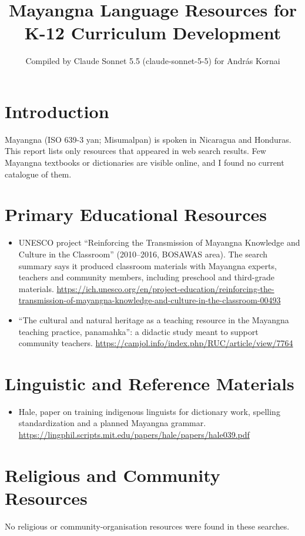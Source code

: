 \documentclass[12pt]{article}
\title{Mayangna Language Resources for K-12 Curriculum Development}
\author{Compiled by Claude Sonnet 5.5 (claude-sonnet-5-5) for Andr\'as Kornai}
\date{}
\begin{document}
\maketitle

\section{Introduction}
Mayangna (ISO 639-3 yan; Misumalpan) is spoken in Nicaragua and Honduras. This report lists only resources that appeared in web search results. Few Mayangna textbooks or dictionaries are visible online, and I found no current catalogue of them.

\section{Primary Educational Resources}
\begin{itemize}
\item UNESCO project ``Reinforcing the Transmission of Mayangna Knowledge and Culture in the Classroom'' (2010--2016, BOSAWAS area). The search summary says it produced classroom materials with Mayangna experts, teachers and community members, including preschool and third-grade materials. \url{https://ich.unesco.org/en/project-education/reinforcing-the-transmission-of-mayangna-knowledge-and-culture-in-the-classroom-00493}
\item ``The cultural and natural heritage as a teaching resource in the Mayangna teaching practice, panamahka'': a didactic study meant to support community teachers. \url{https://camjol.info/index.php/RUC/article/view/7764}
\end{itemize}

\section{Linguistic and Reference Materials}
\begin{itemize}
\item Hale, paper on training indigenous linguists for dictionary work, spelling standardization and a planned Mayangna grammar. \url{https://lingphil.scripts.mit.edu/papers/hale/papers/hale039.pdf}
\end{itemize}

\section{Religious and Community Resources}
No religious or community-organisation resources were found in these searches.
\end{document}
